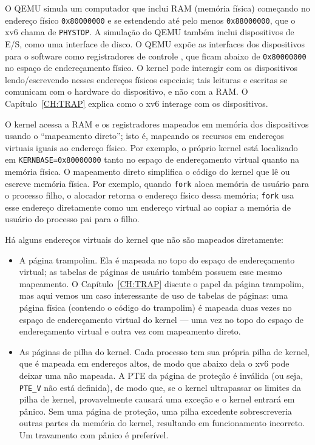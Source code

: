 O QEMU simula um computador que inclui RAM (memória física) começando no endereço físico \texttt{0x80000000} e se estendendo até pelo menos \texttt{0x88000000}, que o xv6 chama de \texttt{PHYSTOP}. 
A simulação do QEMU também inclui dispositivos de E/S, como uma interface de disco. O QEMU expõe as interfaces dos dispositivos para o software como registradores de controle , que ficam abaixo de \texttt{0x80000000} no espaço de endereçamento físico. O kernel pode interagir com os dispositivos lendo/escrevendo nesses endereços físicos especiais; tais leituras e 
escritas se comunicam com o hardware do dispositivo, e não com a RAM. O Capítulo~\ref{CH:TRAP} explica como o xv6 interage com os dispositivos.

O kernel acessa a RAM e os registradores mapeados em memória dos dispositivos usando o “mapeamento direto”; isto é, mapeando os recursos em endereços virtuais iguais ao endereço físico. Por 
exemplo, o próprio kernel está localizado em \lstinline{KERNBASE=0x80000000} tanto no espaço de endereçamento virtual quanto na memória física. O mapeamento direto simplifica o código do kernel que 
lê ou escreve memória física. Por exemplo, quando \lstinline{fork} aloca memória de usuário para o processo filho, o alocador retorna o endereço físico dessa memória; \lstinline{fork} usa esse 
endereço diretamente como um endereço virtual ao copiar a memória de usuário do processo pai para o filho.

Há alguns endereços virtuais do kernel que não são mapeados diretamente:

\begin{itemize}

\item A página trampolim. Ela é mapeada no topo do espaço de endereçamento virtual; as tabelas de páginas de usuário também possuem esse mesmo mapeamento. O Capítulo~\ref{CH:TRAP} discute o papel 
da página trampolim, mas aqui vemos um caso interessante de uso de tabelas de páginas: uma página física (contendo o código do trampolim) é mapeada duas vezes no espaço de endereçamento virtual do 
kernel — uma vez no topo do espaço de endereçamento virtual e outra vez com mapeamento direto.

\item As páginas de pilha do kernel. Cada processo tem sua própria pilha de kernel, que é mapeada em endereços altos, de modo que abaixo dela o xv6 pode deixar uma  
não mapeada. A PTE da página de proteção é inválida (ou seja, \lstinline{PTE_V} não está definida), de modo que, se o kernel ultrapassar os limites da pilha de kernel, provavelmente causará uma 
exceção e o kernel entrará em pânico. Sem uma página de proteção, uma pilha excedente sobrescreveria outras partes da memória do kernel, resultando em funcionamento incorreto. Um travamento com 
pânico é preferível.

\end{itemize}

